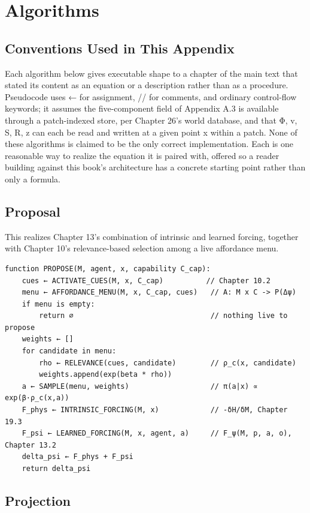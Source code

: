 \chapter{Algorithms}

\section{Conventions Used in This Appendix}

Each algorithm below gives executable shape to a chapter of the main text that stated its content as an equation or a description rather than as a procedure. Pseudocode uses ← for assignment, // for comments, and ordinary control-flow keywords; it assumes the five-component field of Appendix A.3 is available through a patch-indexed store, per Chapter 26's world database, and that Φ, v, S, R, z can each be read and written at a given point x within a patch. None of these algorithms is claimed to be the only correct implementation. Each is one reasonable way to realize the equation it is paired with, offered so a reader building against this book's architecture has a concrete starting point rather than only a formula.

\section{Proposal}

This realizes Chapter 13's combination of intrinsic and learned forcing, together with Chapter 10's relevance-based selection among a live affordance menu.

\begin{Verbatim}[breaklines=true, breaksymbolleft={}, fontsize=\small]
function PROPOSE(M, agent, x, capability C_cap):
    cues ← ACTIVATE_CUES(M, x, C_cap)          // Chapter 10.2
    menu ← AFFORDANCE_MENU(M, x, C_cap, cues)   // A: M x C -> P(Δψ)
    if menu is empty:
        return ∅                                // nothing live to propose
    weights ← []
    for candidate in menu:
        rho ← RELEVANCE(cues, candidate)        // ρ_c(x, candidate)
        weights.append(exp(beta * rho))
    a ← SAMPLE(menu, weights)                   // π(a|x) ∝ exp(β·ρ_c(x,a))
    F_phys ← INTRINSIC_FORCING(M, x)            // -δH/δM, Chapter 19.3
    F_psi ← LEARNED_FORCING(M, x, agent, a)     // F_ψ(M, p, a, o), Chapter 13.2
    delta_psi ← F_phys + F_psi
    return delta_psi
\end{Verbatim}

\section{Projection}

